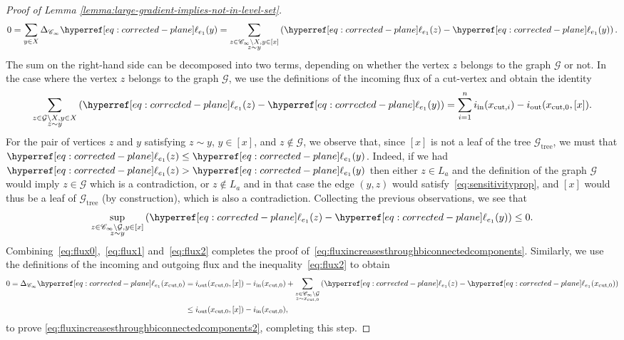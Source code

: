 \documentclass[12pt]{amsart}
\numberwithin{equation}{section}
\begin{document}
\begin{proof}[Proof of Lemma \ref{lemma:large-gradient-implies-not-in-level-set}]
		\begin{equation} \label{eq:flux0}
			0 = \sum_{y \in X} \Delta_{\mathscr{C}_\infty} \ellp{e_1}(y) = \sum_{\substack{z \in \mathscr{C}_\infty \setminus  X, y \in [x] \\ z \sim y}} \left( \ellp{e_1}(z) - \ellp{e_1}(y) \right).
		\end{equation}
		The sum on the right-hand side can be decomposed into two terms, depending on whether the vertex $z$ belongs to the graph $\mathcal{G}$ or not. In the case where the vertex $z$ belongs to the graph $\mathcal{G}$, we use the definitions of the incoming flux of a cut-vertex and obtain the identity
		\begin{equation} \label{eq:flux1}
			\sum_{\substack{z \in \mathcal{G} \setminus X, y \in X \\ z \sim y}} \left( \ellp{e_1}(z) - \ellp{e_1}(y) \right) = \sum_{i = 1}^n i_{\mathrm{in}}(x_{\mathrm{cut} , i}) - i_{\mathrm{out}}(x_{\mathrm{cut} , 0}, [x]) .
		\end{equation}
		For the pair of vertices $z$ and $y$ satisfying $z \sim y$, $y \in [x]$, and $z \notin \mathcal{G}$, we observe that, since $[x]$ is not a leaf of the tree $\mathcal{G}_{\mathrm{tree}}$, we must that $\ellp{e_1} (z) \leq \ellp{e_1}(y)$. Indeed, if we had $\ellp{e_1} (z) > \ellp{e_1}(y)$ then either $z \in L_a$ and the definition of the graph $\mathcal{G}$ would imply $z \in \mathcal{G}$ which is a contradiction, or $z \notin L_a$ and in that case the edge $(y,z)$ would satisfy~\eqref{eq:sensitivityprop}, and $[x]$ would thus be a leaf of $\mathcal{G}_{\mathrm{tree}}$ (by construction), which is also a contradiction. Collecting the previous observations, we see that
		\begin{equation} \label{eq:flux2}
			\sup_{\substack{z \in \mathscr{C}_\infty \setminus \mathcal{G} , y \in [x] \\ z \sim y}} \left( \ellp{e_1}(z) - \ellp{e_1}(y) \right) \leq 0.
		\end{equation}
		Combining~\eqref{eq:flux0},~\eqref{eq:flux1} and~\eqref{eq:flux2} completes the proof of~\eqref{eq:fluxincreasesthroughbiconnectedcomponents}. 
		Similarly, we use the definitions of the incoming and outgoing flux and the inequality~\eqref{eq:flux2} to obtain 
		\begin{align*}
			0 = \Delta_{\mathscr{C}_\infty} \ellp{e_1}(x_{\mathrm{cut} , 0}) & =  i_{\mathrm{out}}(x_{\mathrm{cut} , 0} , [x] ) - i_{\mathrm{in}}(x_{\mathrm{cut} , 0}) + \sum_{\substack{z \in \mathscr{C}_\infty \setminus \mathcal{G} \\ 
					z \sim x_{\mathrm{cut} , 0}}} \left( \ellp{e_1}(z) - \ellp{e_1}(x_{\mathrm{cut} , 0}) \right) \\
			& \leq i_{\mathrm{out}}(x_{\mathrm{cut} , 0}, [x]) - i_{\mathrm{in}}(x_{\mathrm{cut} , 0}),
		\end{align*}
		to prove \eqref{eq:fluxincreasesthroughbiconnectedcomponents2}, completing this step. 
		\medskip
		

\end{proof}
\end{document}
